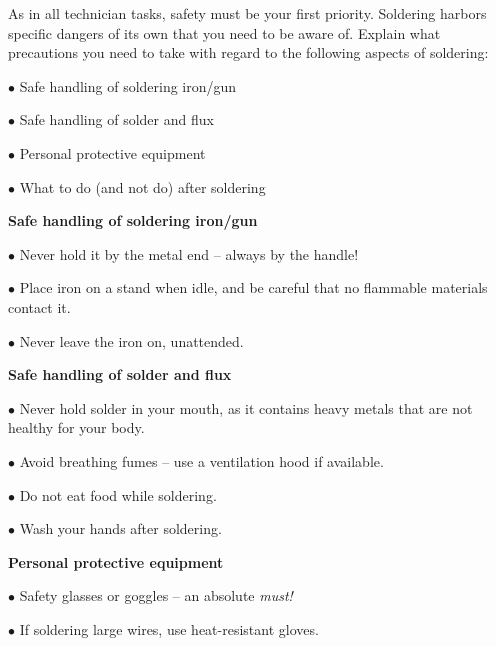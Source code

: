 

As in all technician tasks, safety must be your first priority.  Soldering harbors specific dangers of its own that you need to be aware of.  Explain what precautions you need to take with regard to the following aspects of soldering:

\medskip
\item{$\bullet$} Safe handling of soldering iron/gun
\item{$\bullet$} Safe handling of solder and flux
\item{$\bullet$} Personal protective equipment
\item{$\bullet$} What to do (and not do) after soldering
\medskip







\noindent
{\bf Safe handling of soldering iron/gun}

\item{$\bullet$} Never hold it by the metal end -- always by the handle!
\item{$\bullet$} Place iron on a stand when idle, and be careful that no flammable materials contact it.
\item{$\bullet$} Never leave the iron on, unattended.

\vskip 10pt

\noindent
{\bf Safe handling of solder and flux}

\item{$\bullet$} Never hold solder in your mouth, as it contains heavy metals that are not healthy for your body.
\item{$\bullet$} Avoid breathing fumes -- use a ventilation hood if available.
\item{$\bullet$} Do not eat food while soldering.
\item{$\bullet$} Wash your hands after soldering.

\vskip 10pt

\noindent
{\bf Personal protective equipment}

\item{$\bullet$} Safety glasses or goggles -- an absolute {\it must!}
\item{$\bullet$} If soldering large wires, use heat-resistant gloves.

